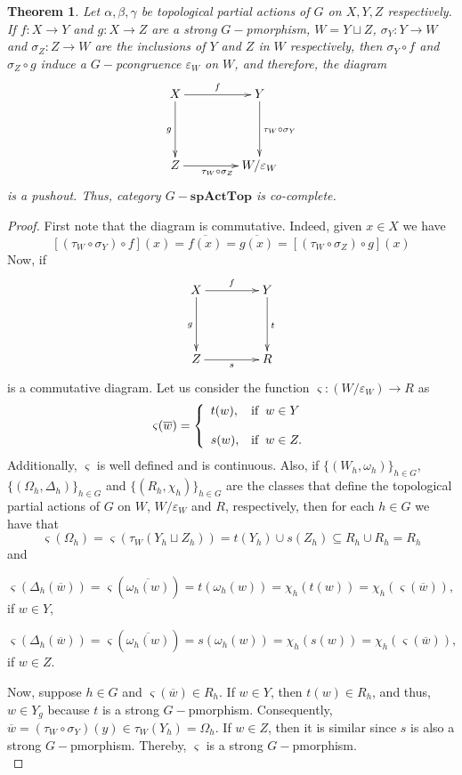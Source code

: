 \documentclass[sn-mathphys-num]{sn-jnl}%
\theoremstyle{thmstyleone}%
\newtheorem{theorem}{Theorem}%
\theoremstyle{thmstyletwo}%
\theoremstyle{thmstylethree}%
\begin{document}
\begin{theorem}
Let $ \alpha, \beta, \gamma $ be topological partial actions of $ G $ on $ X, Y, Z $ respectively. If $ f: X \to Y $ and $ g: X \to Z $ are a strong $G-$pmorphism, $ W = Y \sqcup Z $, $ \sigma_Y: Y \to W $ and $ \sigma_Z: Z \to W $ are the inclusions of $ Y $ and $ Z $ in $W$ respectively, then $ \sigma_Y \circ f $ and $ \sigma_Z \circ g $ induce a $ G-$pcongruence $ \varepsilon_W $ on $ W $, and therefore, the diagram
$$
\xymatrix@=1.5cm{
X \ar[r]^{f} \ar[d]_{g} & Y\ar[d]^{\tau_W\circ \sigma_Y}\\
Z\ar[r]_{\tau_W\circ \sigma_Z}& W/\varepsilon_W
}
$$
is a pushout. Thus, category $G-\mathbf{spActTop}$ is co-complete.
\end{theorem}
\begin{proof}
First note that the diagram is commutative. Indeed, given $ x\in X $ we have
$$ [(\tau_W \circ \sigma_Y) \circ f] (x) = \overline{f (x)} = \overline{g (x)} = [(\tau_W \circ \sigma_Z) \circ g] (x) $$
Now, if
$$
\xymatrix@=1.5cm{
X \ar[r]^{f} \ar[d]_{g} & Y\ar[d]^{t}\\
Z\ar[r]_{s}& R
}
$$
is a commutative diagram. Let us consider  the function $ \varsigma : (W / \varepsilon_W) \to R $  as
$$\varsigma(\overline{w})=
\left\{
\begin{array}{ll}
  t(w), & \text{if} \hspace{0.2cm} w\in Y\\\\
    s(w), & \text{if} \hspace{0.2cm} w\in Z.
     \end{array}
\right.
$$
Additionally, $ \varsigma $ is well defined and is continuous. Also, if
$ \{(W_h,\omega_h)\}_{h\in G} $, $ \{(\Omega_h,\Delta_h)\}_{h\in G} $ and $\{(R_h,\chi_h)\}_{h\in G}  $
are the classes that define the topological partial  actions of $ G $ on
$ W $, $ W / \varepsilon_W $ and $ R $,
respectively, then for each $ h \in G $ we have that
$$\varsigma(\Omega_h)=\varsigma(\tau_W(Y_h\sqcup Z_h))=t(Y_h)\cup s(Z_h)\subseteq R_h\cup R_h=R_h$$
and
\begin{center}
$\varsigma(\Delta_h(\overline{w}))=\varsigma(\overline{\omega_h(w)})=t(\omega_h(w))=\chi_h(t(w))=\chi_h(\varsigma(\overline{w})),$ if $w\in Y$,
\end{center}
\begin{center}
$\varsigma(\Delta_h(\overline{w}))=\varsigma(\overline{\omega_h(w)})=s(\omega_h(w))=\chi_h(s(w))=\chi_h(\varsigma(\overline{w})),$ if $w\in Z$.
\end{center}
Now, suppose $h\in G$ and $\varsigma (\overline{w})\in R_h$. If $w\in Y$, then $t(w)\in R_h$, and thus, $w\in Y_g$ because $t$ is a strong $G-$pmorphism. Consequently, $\overline{w}=(\tau_W\circ \sigma_Y)(y)\in \tau_W(Y_h)=\Omega_h$. If $w\in Z$, then it is similar since $s$ is also a strong $G-$pmorphism. Thereby, $ \varsigma $ is a strong $ G-$pmorphism.\\


\end{proof}
\end{document}
